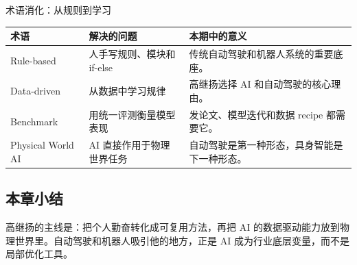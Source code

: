 \begin{knowledgebox}{术语消化：从规则到学习}
\begin{tabularx}{\textwidth}{p{}p{}X}
\toprule
术语 & 解决的问题 & 本期中的意义 \\
\midrule
Rule-based & 人手写规则、模块和 if-else & 传统自动驾驶和机器人系统的重要底座。 \\
Data-driven & 从数据中学习规律 & 高继扬选择 AI 和自动驾驶的核心理由。 \\
Benchmark & 用统一评测衡量模型表现 & 发论文、模型迭代和数据 recipe 都需要它。 \\
Physical World AI & AI 直接作用于物理世界任务 & 自动驾驶是第一种形态，具身智能是下一种形态。 \\
\bottomrule
\end{tabularx}
\end{knowledgebox}

\subsection{本章小结}

高继扬的主线是：把个人勤奋转化成可复用方法，再把 AI 的数据驱动能力放到物理世界里。自动驾驶和机器人吸引他的地方，正是 AI 成为行业底层变量，而不是局部优化工具。

